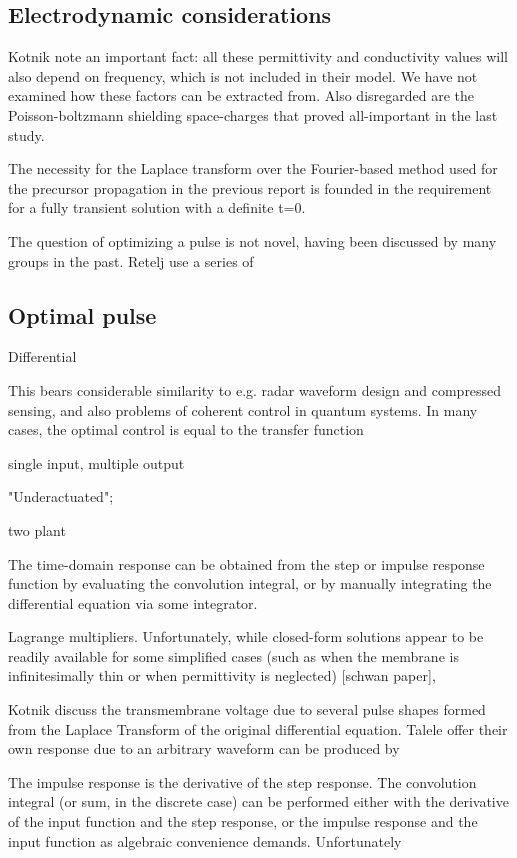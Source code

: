 \documentclass[fleqn,10pt]{paper}
\begin{document}
\subsection{Electrodynamic considerations}

Kotnik note an important fact: all these permittivity and conductivity values will also depend on frequency, which is not included in their model. We have not examined how these factors can be extracted from. Also disregarded are the Poisson-boltzmann shielding space-charges that proved all-important in the last study. 

The necessity for the Laplace transform over the Fourier-based method used for the precursor propagation in the previous report is founded in the requirement for a fully transient solution with a definite t=0.

The question of optimizing a pulse is not novel, having been discussed by many groups in the past. Retelj use a series of 

\subsection{Optimal pulse}

Differential 

This bears considerable similarity to e.g. radar waveform design and compressed sensing, and also problems of coherent control in quantum systems. In many cases, the optimal control is equal to the transfer function


single input, multiple output 

"Underactuated";

two plant

The time-domain response can be obtained from the step or impulse response function by evaluating the convolution integral, or by manually integrating the differential equation via some integrator.

Lagrange multipliers. Unfortunately, while closed-form solutions appear to be readily available for some simplified cases (such as when the membrane is infinitesimally thin or when permittivity is neglected) [schwan paper], 

Kotnik discuss the transmembrane voltage due to several pulse shapes formed from the Laplace Transform of the original differential equation. Talele offer their own response due to an arbitrary waveform can be produced by 

The impulse response is the derivative of the step response. The convolution integral (or sum, in the discrete case) can be performed either with the derivative of the input function and the step response, or the impulse response and the input function as algebraic convenience demands. Unfortunately
\end{document}
